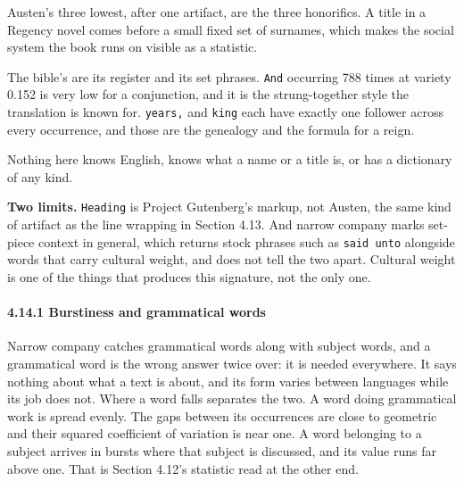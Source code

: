 Austen's three lowest, after one artifact, are the three honorifics. A title in a Regency novel comes before a small fixed set of surnames, which makes the social system the book runs on visible as a statistic.

The bible's are its register and its set phrases. \texttt{And} occurring 788 times at variety 0.152 is very low for a conjunction, and it is the strung-together style the translation is known for. \texttt{years,} and \texttt{king} each have exactly one follower across every occurrence, and those are the genealogy and the formula for a reign.

Nothing here knows English, knows what a name or a title is, or has a dictionary of any kind.

\noindent\textbf{Two limits.} \texttt{Heading} is Project Gutenberg's markup, not Austen, the same kind of artifact as the line wrapping in Section 4.13. And narrow company marks set-piece context in general, which returns stock phrases such as \texttt{said unto} alongside words that carry cultural weight, and does not tell the two apart. Cultural weight is one of the things that produces this signature, not the only one.

\paragraph{4.14.1 Burstiness and grammatical words}

Narrow company catches grammatical words along with subject words, and a grammatical word is the wrong answer twice over: it is needed everywhere. It says nothing about what a text is about, and its form varies between languages while its job does not. Where a word falls separates the two. A word doing grammatical work is spread evenly. The gaps between its occurrences are close to geometric and their squared coefficient of variation is near one. A word belonging to a subject arrives in bursts where that subject is discussed, and its value runs far above one. That is Section 4.12's statistic read at the other end.

